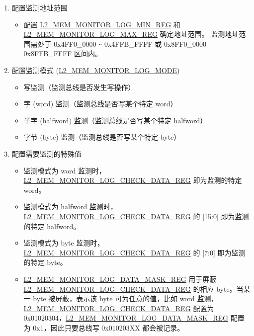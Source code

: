 \documentclass[main\_\_CN.tex]{subfiles}
\begin{document}
\begin{enumerate}

    \item 配置监测地址范围
        \begin{itemize}
            \item 配置 \hyperref[regdesc:L2MEMMONITORLOGMINREG]{L2\_MEM\_MONITOR\_LOG\_MIN\_REG} 和 \hyperref[regdesc:L2MEMMONITORLOGMAXREG]{L2\_MEM\_MONITOR\_LOG\_MAX\_REG} 确定地址范围。 监测地址范围需处于 0x4FF0\_0000 \verb+~+ 0x4FFB\_FFFF 或 0x8FF0\_0000 - 0x8FFB\_FFFF 区间内。
        \end{itemize}
    \item 配置监测模式 (\hyperref[fielddesc:L2MEMMONITORLOGMODE]{L2\_MEM\_MONITOR\_LOG\_MODE})
       \begin{itemize}
            \item 写监测（监测总线是否发生写操作）
           \item 字 (word) 监测（监测总线是否写某个特定 word）
           \item 半字 (halfword) 监测（监测总线是否写某个特定 halfword）
           \item 字节 (byte) 监测（监测总线是否写某个特定 byte）
       \end{itemize}
    \item 配置需要监测的特殊值
        \begin{itemize}
            \item 监测模式为 word 监测时，\hyperref[regdesc:L2MEMMONITORLOGCHECKDATAREG]{L2\_MEM\_MONITOR\_LOG\_CHECK\_DATA\_REG} 即为监测的特定 word。
            \item 监测模式为 halfword 监测时，\hyperref[regdesc:L2MEMMONITORLOGCHECKDATAREG]{L2\_MEM\_MONITOR\_LOG\_CHECK\_DATA\_REG} 的 [15:0] 即为监测的特定 halfword。
            \item 监测模式为 byte 监测时，\hyperref[regdesc:L2MEMMONITORLOGCHECKDATAREG]{L2\_MEM\_MONITOR\_LOG\_CHECK\_DATA\_REG} 的 [7:0] 即为监测的特定 byte。
            \item \hyperref[regdesc:L2MEMMONITORLOGDATAMASKREG]{L2\_MEM\_MONITOR\_LOG\_DATA\_MASK\_REG} 用于屏蔽 \hyperref[regdesc:L2MEMMONITORLOGCHECKDATAREG]{L2\_MEM\_MONITOR\_LOG\_CHECK\_DATA\_REG} 的相应 byte。当某一 byte 被屏蔽，表示该 byte 可为任意的值，比如 word 监测，\hyperref[regdesc:L2MEMMONITORLOGCHECKDATAREG]{L2\_MEM\_MONITOR\_LOG\_CHECK\_DATA\_REG} 配置为 0x01020304，\hyperref[regdesc:L2MEMMONITORLOGDATAMASKREG]{L2\_MEM\_MONITOR\_LOG\_DATA\_MASK\_REG} 配置为 0x1，因此只要总线写 0x010203XX 都会被记录。
        \end{itemize}

\end{enumerate}
\end{document}
